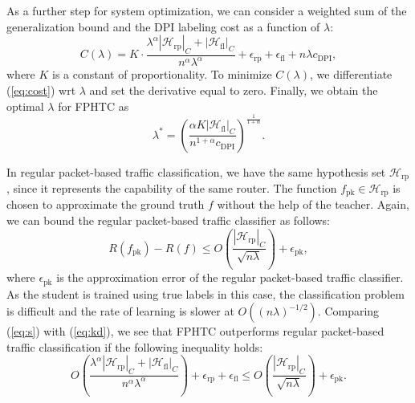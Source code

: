 As a further step for system optimization, we can consider a weighted sum of the generalization bound and the DPI labeling cost as a function of $\lambda$:
\begin{equation}
C(\lambda) = K\cdot\frac{\lambda^\alpha|\mathcal{H}_\text{rp}|_C+|\mathcal{H}_\text{fl}|_C}{n^\alpha\lambda^\alpha} + \epsilon_\text{rp}+ \epsilon_\text{fl} + n\lambda c_\text{DPI},
\label{eq:cost}
\end{equation} 
where $K$ is a constant of proportionality. To minimize $C(\lambda)$, we differentiate (\ref{eq:cost}) wrt $\lambda$ and set the derivative equal to zero. Finally, we obtain the optimal $\lambda$ for FPHTC as
\begin{equation}
\lambda^* =\left(\frac{\alpha K|\mathcal{H}_\text{fl}|_C}{n^{1+\alpha} c_\text{DPI}}\right)^{\frac{1}{1+\alpha}}.
\label{eq:opt}
\end{equation}

In regular packet-based traffic classification, we have the same hypothesis set $\mathcal{H}_\text{rp}$, since it represents the capability of the same router. The function $f_\text{pk}\in\mathcal{H}_\text{rp}$ is chosen to approximate the ground truth $f$ without the help of the teacher. Again, we can bound the regular packet-based traffic classifier as follows:
\begin{equation}
R(f_\text{pk})-R(f)\leq O\left(\frac{|\mathcal{H}_\text{rp}|_C}{\sqrt{n\lambda}}\right) + \epsilon_\text{pk},
\label{eq:s}
\end{equation}
where $\epsilon_\text{pk}$ is the approximation error of the regular packet-based traffic classifier. As the student is trained using true labels in this case, the classification problem is difficult and the rate of learning is slower at $O((n\lambda)^{-1/2})$. Comparing (\ref{eq:s}) with (\ref{eq:kd}), we see that FPHTC outperforms regular packet-based traffic classification if the following inequality holds:
\begin{equation}
O\left(\frac{\lambda^\alpha|\mathcal{H}_\text{rp}|_C+|\mathcal{H}_\text{fl}|_C}{n^\alpha\lambda^\alpha}\right) + \epsilon_\text{rp}+ \epsilon_\text{fl}
\leq
O\left(\frac{|\mathcal{H}_\text{rp}|_C}{\sqrt{n\lambda}}\right) + \epsilon_\text{pk}.
\label{eq: ineq}
\end{equation} 

